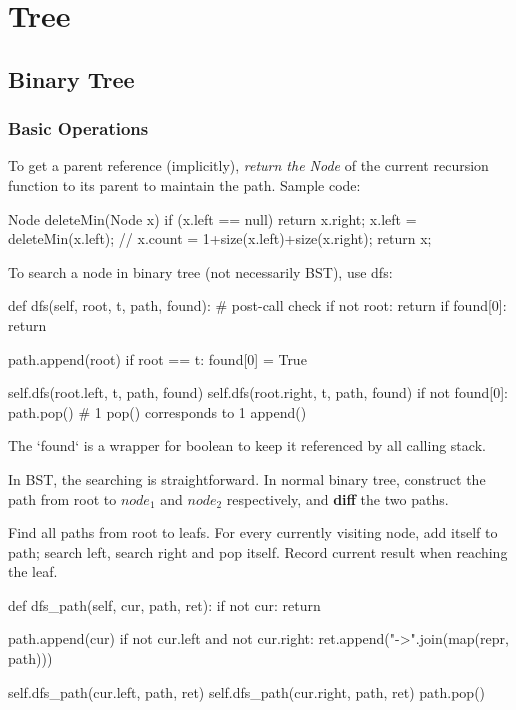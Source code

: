 \chapter{Tree}

\section{Binary Tree}
\subsection{Basic Operations}
 To get a parent reference (implicitly), \textit{return the Node} of the current recursion function to its parent to maintain the path. Sample code:
\begin{java}
Node deleteMin(Node x) {
    if (x.left == null) return x.right;
    x.left = deleteMin(x.left);
    // x.count = 1+size(x.left)+size(x.right);
    return x;
}
\end{java}
 To search a node in binary tree (not necessarily BST), use dfs:
\begin{python}
def dfs(self, root, t, path, found):
    # post-call check
    if not root: return        
    if found[0]: return 

    path.append(root)
    if root == t:
        found[0] = True

    self.dfs(root.left, t, path, found)
    self.dfs(root.right, t, path, found)
    if not found[0]:
        path.pop()  # 1 pop() corresponds to 1 append()
\end{python}
The `found` is a wrapper for boolean to keep it referenced by all calling stack. 

 In BST, the searching is straightforward. In normal binary tree, construct the path from root to $node_1$ and $node_2$ respectively, and \textbf{diff} the two paths.

 Find all paths from root to leafs. For every currently visiting node, add itself to path; search left, search right and pop itself. Record current result when reaching the leaf.
\begin{python}
def dfs_path(self, cur, path, ret):
    if not cur: return

    path.append(cur)
    if not cur.left and not cur.right:
        ret.append("->".join(map(repr, path)))

    self.dfs_path(cur.left, path, ret)
    self.dfs_path(cur.right, path, ret)
    path.pop()
\end{python}

